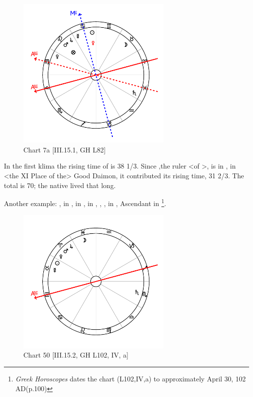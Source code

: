 \clearpage
\begin{figure}
\centering
\vspace{-20pt}
\includegraphics[width=0.68\textwidth]{charts/3_15_1}
\caption{Chart 7a [III.15.1, GH L82]}
\label{fig:chart7a}
\end{figure} 

In the first klima the rising time of \Virgo\xspace is 38 1/3. Since \Mercury,the ruler <of \Virgo>, is in \Cancer, in <the XI Place of the> Good Daimon, it contributed its rising time, 31 2/3. The total is 70; the native lived that long.

\newpage
Another example: \Sun, \Mercury\xspace in \Taurus, \Moon\xspace in \Pisces, \Saturn\xspace in \Scorpio, \Jupiter, \Mars, \Venus in \Aries, Ascendant in \Gemini
\footnote{\textit{Greek Horoscopes} dates the chart (L102,IV,a) to approximately April 30, 102 AD(p.100)}.

\clearpage
\begin{figure}
\centering
\vspace{-20pt}
\includegraphics[width=0.68\textwidth]{charts/3_15_2}
\caption{Chart 50 [III.15.2, GH L102, IV, a]}
\label{fig:chart50}
\end{figure} 


